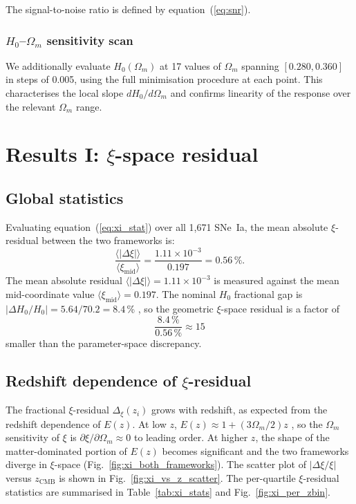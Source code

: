 \documentclass[fleqn,usenatbib,useAMS]{mnras}
\begin{document}
The signal-to-noise ratio is defined by equation~(\ref{eq:snr}).

\subsubsection{$H_0$--$\Omega_m$ sensitivity scan}

We additionally evaluate $H_0(\Omega_m)$ at 17 values of
$\Omega_m$ spanning $[0.280, 0.360]$ in steps of 0.005,
using the full minimisation procedure at each point.
This characterises the local slope
$dH_0/d\Omega_m$ and confirms linearity of the response over
the relevant $\Omega_m$ range.

\section{Results I: $\xi$-space residual}
\label{sec:results_xi}

\subsection{Global statistics}

Evaluating equation~(\ref{eq:xi_stat}) over all 1{,}671 SNe~Ia,
the mean absolute $\xi$-residual between the two frameworks is:
\begin{equation}
  \frac{\langle|\Delta\xi|\rangle}{\langle\xi_\mathrm{mid}\rangle}
    = \frac{1.11\times10^{-3}}{0.197} = 0.56\,\%.
  \label{eq:xi_result}
\end{equation}
The mean absolute residual $\langle|\Delta\xi|\rangle = 1.11 \times 10^{-3}$
is measured against the mean mid-coordinate value
$\langle\xi_\mathrm{mid}\rangle = 0.197$.
The nominal $H_0$ fractional gap is
$|{\Delta H_0}/{H_0}| = 5.64/70.2 = 8.4$\,\%
\citep{riess2022,planck2020}, so the
geometric $\xi$-space residual is a factor of
\begin{equation}
  \frac{8.4\,\%}{0.56\,\%} \approx 15
  \label{eq:factor15}
\end{equation}
smaller than the parameter-space discrepancy.

\subsection{Redshift dependence of $\xi$-residual}

The fractional $\xi$-residual $\Delta_\xi(z_i)$ grows with redshift,
as expected from the redshift dependence of $E(z)$.
At low $z$, $E(z) \approx 1 + (3\Omega_m/2)z$ \citep{hogg1999}, so the $\Omega_m$
sensitivity of $\xi$ is $\partial\xi/\partial\Omega_m \approx 0$
to leading order.
At higher $z$, the shape of the matter-dominated portion of $E(z)$
becomes significant and the two frameworks diverge in $\xi$-space
(Fig.~\ref{fig:xi_both_frameworks}).
The scatter plot of $|\Delta\xi/\xi|$ versus $z_\mathrm{CMB}$
is shown in Fig.~\ref{fig:xi_vs_z_scatter}.
The per-quartile $\xi$-residual statistics are summarised in Table~\ref{tab:xi_stats} and Fig.~\ref{fig:xi_per_zbin}.
\end{document}
